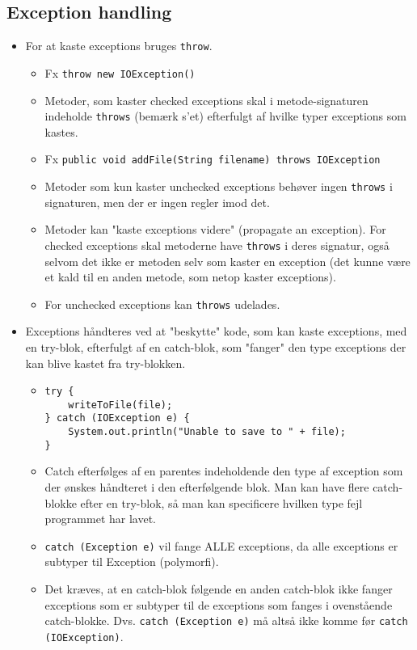 \subsection{Exception handling}
\begin{itemize}
  \item For at kaste exceptions bruges \verb|throw|.
  \begin{itemize}
    \item Fx \verb|throw new IOException()|
    \item Metoder, som kaster checked exceptions skal i metode-signaturen indeholde \verb|throws| (bemærk s'et) efterfulgt af hvilke typer exceptions som kastes.
    \item Fx \verb|public void addFile(String filename) throws IOException|
    \item Metoder som kun kaster unchecked exceptions behøver ingen \verb|throws| i signaturen, men der er ingen regler imod det.
    \item Metoder kan "kaste exceptions videre" (propagate an exception). For checked exceptions skal metoderne have \verb|throws| i deres signatur, også selvom det ikke er metoden selv som kaster en exception (det kunne være et kald til en anden metode, som netop kaster exceptions).
    \item For unchecked exceptions kan \verb|throws| udelades.
  \end{itemize}
  \item Exceptions håndteres ved at "beskytte" kode, som kan kaste exceptions, med en try-blok, efterfulgt af en catch-blok, som "fanger" den type exceptions der kan blive kastet fra try-blokken.
  \begin{itemize}
    \item
      \begin{verbatim}
try {
    writeToFile(file);
} catch (IOException e) {
    System.out.println("Unable to save to " + file);
}
      \end{verbatim}
    \item Catch efterfølges af en parentes indeholdende den type af exception som der ønskes håndteret i den efterfølgende blok. Man kan have flere catch-blokke efter en try-blok, så man kan specificere hvilken type fejl programmet har lavet.
    \item \verb|catch (Exception e)| vil fange ALLE exceptions, da alle exceptions er subtyper til Exception (polymorfi).
    \item Det kræves, at en catch-blok følgende en anden catch-blok ikke fanger exceptions som er subtyper til de exceptions som fanges i ovenstående catch-blokke. Dvs. \verb|catch (Exception e)| må altså ikke komme før \verb|catch (IOException)|.

\end{itemize}
\end{itemize}
